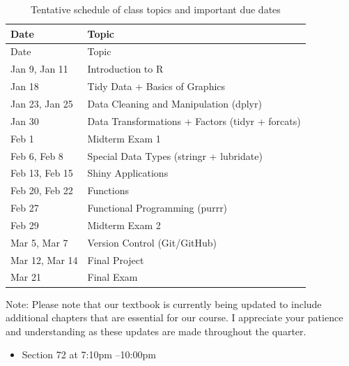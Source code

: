 \documentclass[
  11pt,
  letterpaper,
  DIV=11,
  numbers=noendperiod]{scrartcl}
\providecommand{\tightlist}{%
  \setlength{\itemsep}{0pt}\setlength{\parskip}{0pt}}\usepackage{longtable,booktabs,array}
\begin{document}
\begin{longtable}[]{@{}ll@{}}
\caption{Tentative schedule of class topics and important due
dates}\tabularnewline
\toprule\noalign{}
Date & Topic \\
\midrule\noalign{}
\endfirsthead
\toprule\noalign{}
Date & Topic \\
\midrule\noalign{}
\endhead
\bottomrule\noalign{}
\endlastfoot
Jan 9, Jan 11 & Introduction to R \\
Jan 18 & Tidy Data + Basics of Graphics \\
Jan 23, Jan 25 & Data Cleaning and Manipulation (dplyr) \\
Jan 30 & Data Transformations + Factors (tidyr + forcats) \\
Feb 1 & Midterm Exam 1 \\
Feb 6, Feb 8 & Special Data Types (stringr + lubridate) \\
Feb 13, Feb 15 & Shiny Applications \\
Feb 20, Feb 22 & Functions \\
Feb 27 & Functional Programming (purrr) \\
Feb 29 & Midterm Exam 2 \\
Mar 5, Mar 7 & Version Control (Git/GitHub) \\
Mar 12, Mar 14 & Final Project \\
Mar 21 & Final Exam \\
\end{longtable}

Note: Please note that our textbook is currently being updated to
include additional chapters that are essential for our course. I
appreciate your patience and understanding as these updates are made
throughout the quarter.

\begin{tcolorbox}[enhanced jigsaw, toptitle=1mm, arc=.35mm, toprule=.15mm, colback=white, opacityback=0, coltitle=black, colbacktitle=quarto-callout-tip-color!10!white, colframe=quarto-callout-tip-color-frame, bottomtitle=1mm, opacitybacktitle=0.6, leftrule=.75mm, title=\textcolor{quarto-callout-tip-color}{\faLightbulb}\hspace{0.5em}{\textbf{Final Exam} on Thursday, March 21:}, left=2mm, bottomrule=.15mm, breakable, titlerule=0mm, rightrule=.15mm]

\begin{itemize}
\tightlist
\item
  Section 72 at 7:10pm --10:00pm
\end{itemize}

\end{tcolorbox}
\end{document}
